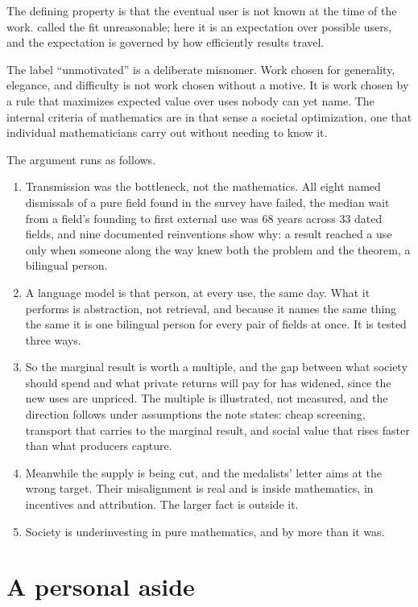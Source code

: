 \documentclass[11pt]{article}
\theoremstyle{definition}
\theoremstyle{remark}
\begin{document}
The defining property is that the eventual user is not known at the time of the work. \citet{wigner1960} called the fit unreasonable; here it is an expectation over possible users, and the expectation is governed by how efficiently results travel.

The label ``unmotivated'' is a deliberate misnomer. Work chosen for generality, elegance, and difficulty is not work chosen without a motive. It is work chosen by a rule that maximizes expected value over uses nobody can yet name. The internal criteria of mathematics are in that sense a societal optimization, one that individual mathematicians carry out without needing to know it.

The argument runs as follows.
\begin{enumerate}
\item Transmission was the bottleneck, not the mathematics. All eight named dismissals of a pure field found in the survey have failed, the median wait from a field's founding to first external use was 68 years across 33 dated fields, and nine documented reinventions show why: a result reached a use only when someone along the way knew both the problem and the theorem, a bilingual person.
\item A language model is that person, at every use, the same day. What it performs is abstraction, not retrieval, and because it names the same thing the same it is one bilingual person for every pair of fields at once. It is tested three ways.
\item So the marginal result is worth a multiple, and the gap between what society should spend and what private returns will pay for has widened, since the new uses are unpriced. The multiple is illustrated, not measured, and the direction follows under assumptions the note states: cheap screening, transport that carries to the marginal result, and social value that rises faster than what producers capture.
\item Meanwhile the supply is being cut, and the medalists' letter aims at the wrong target. Their misalignment is real and is inside mathematics, in incentives and attribution. The larger fact is outside it.
\item Society is underinvesting in pure mathematics, and by more than it was.
\end{enumerate}

\section{A personal aside}
\end{document}

